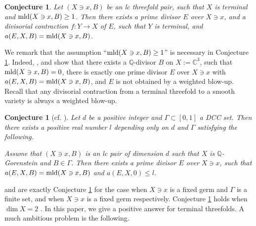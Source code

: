 \documentclass[11pt]{amsart}
\numberwithin{equation}{section}
\newcommand\han[1]{\todo[color=yellow!40]{#1}} %
\newcommand{\Cc}{\mathbb{C}}
\newcommand{\Qq}{\mathbb{Q}}
\newcommand{\mld}{{\rm{mld}}}
\newcommand{\Ii}{{\Gamma}}
\newtheorem{conj}[thm]{Conjecture}
\newtheorem{prob}[thm]{Problem}
\theoremstyle{definition}
\theoremstyle{definition}
\begin{document}
\begin{conj}\label{conj: compute mld terminal blow-up}
Let $(X\ni x, B)$ be an lc threefold pair, such that $X$ is terminal and $\mld(X\ni x, B)\geq 1$. Then there exists a prime divisor $E$ over $X\ni x$, and a divisorial contraction $f: Y\to X$ of $E$, such that $Y$ is terminal, and $a(E,X,B)=\mld(X\ni x, B)$.
\end{conj}


We remark that the assumption ``$\mld(X\ni x, B)\geq 1$'' is necessary in Conjecture \ref{conj: compute mld terminal blow-up}. Indeed, \cite[Excerise 6.45]{KSC04}, and \cite[Example 5]{Kaw17} show that there exists a $\Qq$-divisor $B$ on $X:=\Cc^3$, such that $\mld(X\ni x,B)=0$, there is exactly one prime divisor $E$ over $X\ni x$ with $a(E,X,B)=\mld(X\ni x,B)$, and $E$ is not obtained by a weighted blow-up. Recall that any divisorial contraction from a terminal threefold to a smooth variety is always a weighted blow-up. 


\begin{conj}[{cf. \cite[Introduction]{HL20}}]\label{conj: bdd mld computing divisor}
    Let $d$ be a positive integer and $\Ii\subset[0,1]$ a DCC set. Then there exists a positive real number $l$ depending only on $d$ and $\Ii$ satisfying the following. 
    
    Assume that $(X\ni x,B)$ is an lc pair of dimension $d$ such that $X$ is $\Qq$-Gorenstein and $B\in\Ii$. Then there exists a prime divisor $E$ over $X\ni x$, such that $a(E,X,B)=\mld(X\ni x,B)$ and $a(E,X,0)\leq l$.
\end{conj}
\cite[Conjecture~1.1]{MN18} and \cite[Problem~7.17]{CH21} are exactly Conjecture \ref{conj: bdd mld computing divisor} for the case when $X\ni x$ is a fixed germ and $\Ii$ is a finite set, and when $X\ni x$ is a fixed germ respectively. Conjecture \ref{conj: bdd mld computing divisor} holds when $\dim X=2$ \cite[Theorem~1.2]{HL20}. In this paper, we give a positive answer for terminal threefolds. A much ambitious problem is the following.

\end{document}

